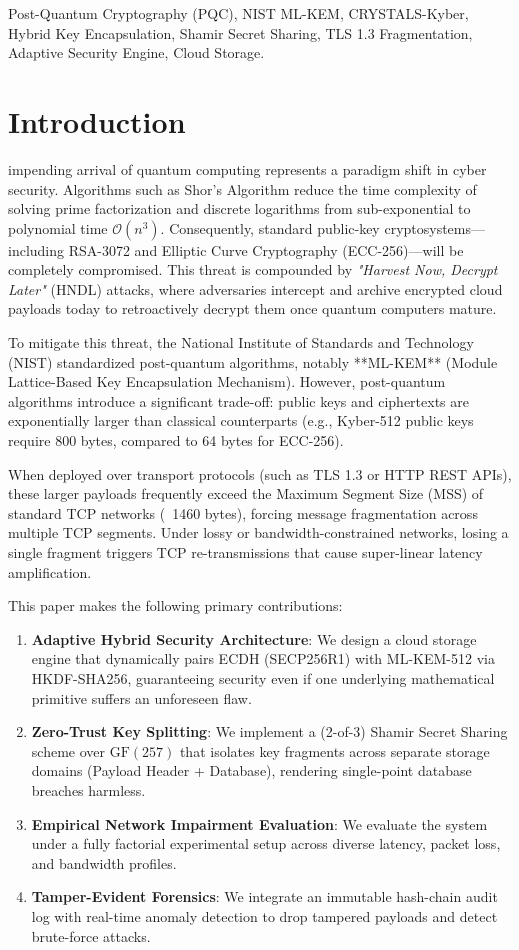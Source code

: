 \documentclass[journal,twoside]{IEEEtran}
\begin{document}
\begin{IEEEkeywords}
Post-Quantum Cryptography (PQC), NIST ML-KEM, CRYSTALS-Kyber, Hybrid Key Encapsulation, Shamir Secret Sharing, TLS 1.3 Fragmentation, Adaptive Security Engine, Cloud Storage.
\end{IEEEkeywords}

\section{Introduction}
 impending arrival of quantum computing represents a paradigm shift in cyber security. Algorithms such as Shor's Algorithm reduce the time complexity of solving prime factorization and discrete logarithms from sub-exponential to polynomial time $\mathcal{O}(n^3)$. Consequently, standard public-key cryptosystems—including RSA-3072 and Elliptic Curve Cryptography (ECC-256)—will be completely compromised. This threat is compounded by \textit{"Harvest Now, Decrypt Later"} (HNDL) attacks, where adversaries intercept and archive encrypted cloud payloads today to retroactively decrypt them once quantum computers mature.

To mitigate this threat, the National Institute of Standards and Technology (NIST) standardized post-quantum algorithms, notably **ML-KEM** (Module Lattice-Based Key Encapsulation Mechanism). However, post-quantum algorithms introduce a significant trade-off: public keys and ciphertexts are exponentially larger than classical counterparts (e.g., Kyber-512 public keys require 800 bytes, compared to 64 bytes for ECC-256).

When deployed over transport protocols (such as TLS 1.3 or HTTP REST APIs), these larger payloads frequently exceed the Maximum Segment Size (MSS) of standard TCP networks (~1460 bytes), forcing message fragmentation across multiple TCP segments. Under lossy or bandwidth-constrained networks, losing a single fragment triggers TCP re-transmissions that cause super-linear latency amplification.

This paper makes the following primary contributions:
\begin{enumerate}
    \item \textbf{Adaptive Hybrid Security Architecture}: We design a cloud storage engine that dynamically pairs ECDH (SECP256R1) with ML-KEM-512 via HKDF-SHA256, guaranteeing security even if one underlying mathematical primitive suffers an unforeseen flaw.
    \item \textbf{Zero-Trust Key Splitting}: We implement a (2-of-3) Shamir Secret Sharing scheme over $\text{GF}(257)$ that isolates key fragments across separate storage domains (Payload Header + Database), rendering single-point database breaches harmless.
    \item \textbf{Empirical Network Impairment Evaluation}: We evaluate the system under a fully factorial experimental setup across diverse latency, packet loss, and bandwidth profiles.
    \item \textbf{Tamper-Evident Forensics}: We integrate an immutable hash-chain audit log with real-time anomaly detection to drop tampered payloads and detect brute-force attacks.
\end{enumerate}
\end{document}
